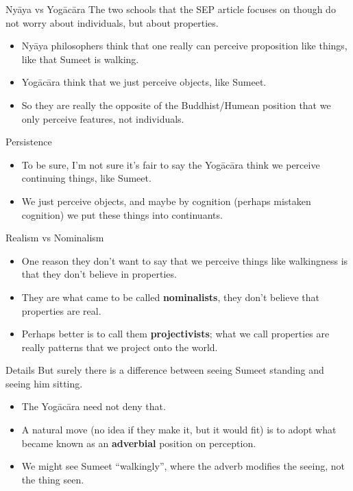\documentclass[
  17pt,
  letterpaper,
  ignorenonframetext,
  aspectratio=169,
  handout]{beamer}
\providecommand{\tightlist}{%
  \setlength{\itemsep}{0pt}\setlength{\parskip}{0pt}}\usepackage{longtable,booktabs,array}
\begin{document}
\begin{frame}{Nyāya vs Yogācāra}
\protect\hypertarget{nyux101ya-vs-yogux101cux101ra}{}
The two schools that the SEP article focuses on though do not worry
about individuals, but about properties.

\begin{itemize}[<+->]
\tightlist
\item
  Nyāya philosophers think that one really can perceive proposition like
  things, like that Sumeet is walking.
\item
  Yogācāra think that we just perceive objects, like Sumeet.
\item
  So they are really the opposite of the Buddhist/Humean position that
  we only perceive features, not individuals.
\end{itemize}
\end{frame}

\begin{frame}{Persistence}
\protect\hypertarget{persistence}{}
\begin{itemize}[<+->]
\tightlist
\item
  To be sure, I'm not sure it's fair to say the Yogācāra think we
  perceive continuing things, like Sumeet.
\item
  We just perceive objects, and maybe by cognition (perhaps mistaken
  cognition) we put these things into continuants.
\end{itemize}
\end{frame}

\begin{frame}{Realism vs Nominalism}
\protect\hypertarget{realism-vs-nominalism}{}
\begin{itemize}[<+->]
\tightlist
\item
  One reason they don't want to say that we perceive things like
  walkingness is that they don't believe in properties.
\item
  They are what came to be called \textbf{nominalists}, they don't
  believe that properties are real.
\item
  Perhaps better is to call them \textbf{projectivists}; what we call
  properties are really patterns that we project onto the world.
\end{itemize}
\end{frame}

\begin{frame}{Details}
\protect\hypertarget{details}{}
But surely there is a difference between seeing Sumeet standing and
seeing him sitting.

\begin{itemize}[<+->]
\tightlist
\item
  The Yogācāra need not deny that.
\item
  A natural move (no idea if they make it, but it would fit) is to adopt
  what became known as an \textbf{adverbial} position on perception.
\item
  We might see Sumeet ``walkingly'', where the adverb modifies the
  seeing, not the thing seen.
\end{itemize}
\end{frame}
\end{document}
